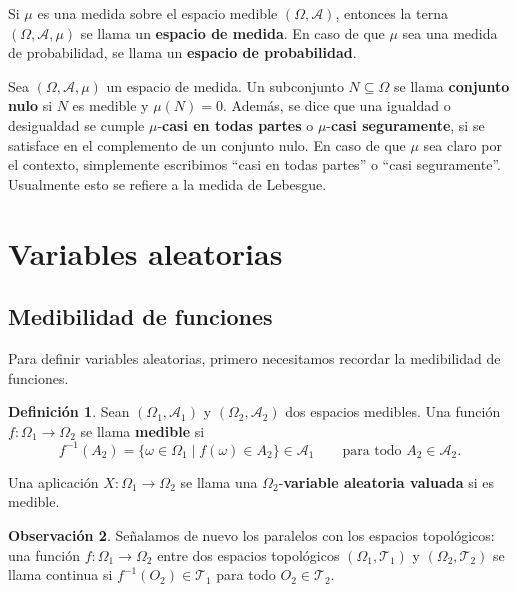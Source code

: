 \documentclass[11pt]{report}
\newenvironment{tcolorbox}[1][]{\par\medskip\noindent\ignorespaces}{\par\medskip}
\theoremstyle{definition}
\newtheorem{definicion}{Definición}[section]
\newtheorem{observacion}[definicion]{Observación}
\theoremstyle{plain}
\numberwithin{equation}{section}
\begin{document}
Si \(\mu\) es una medida sobre el espacio medible \((\Omega,\mathcal{A})\), entonces la terna \((\Omega,\mathcal{A},\mu)\) se llama un \textbf{espacio de medida}. En caso de que \(\mu\) sea una medida de probabilidad, se llama un \textbf{espacio de probabilidad}.

Sea \((\Omega,\mathcal{A},\mu)\) un espacio de medida. Un subconjunto \(N\subseteq \Omega\) se llama \textbf{conjunto nulo} si \(N\) es medible y \(\mu(N)=0\). Además, se dice que una igualdad o desigualdad se cumple \(\mu\)-\textbf{casi en todas partes} o \(\mu\)-\textbf{casi seguramente}, si se satisface en el complemento de un conjunto nulo. En caso de que \(\mu\) sea claro por el contexto, simplemente escribimos ``casi en todas partes'' o ``casi seguramente''. Usualmente esto se refiere a la medida de Lebesgue.

\section{Variables aleatorias}

\subsection{Medibilidad de funciones}

Para definir variables aleatorias, primero necesitamos recordar la medibilidad de funciones.

\begin{tcolorbox}[colback=blue!8, colframe=blue!8, boxrule=0pt]
\begin{definicion}
Sean \((\Omega_1,\mathcal{A}_1)\) y \((\Omega_2,\mathcal{A}_2)\) dos espacios medibles. Una función \(f:\Omega_1\to\Omega_2\) se llama \textbf{medible} si
\begin{equation*}
    f^{-1}(A_2)=\{\omega\in\Omega_1\mid f(\omega)\in A_2\}\in\mathcal{A}_1
    \qquad
    \text{para todo } A_2\in\mathcal{A}_2.
\end{equation*}

Una aplicación \(X:\Omega_1\to\Omega_2\) se llama una \(\Omega_2\)-\textbf{variable aleatoria valuada} si es medible.
\end{definicion}
\end{tcolorbox}

\begin{observacion}
Señalamos de nuevo los paralelos con los espacios topológicos: una función \(f:\Omega_1\to\Omega_2\) entre dos espacios topológicos \((\Omega_1,\mathcal{T}_1)\) y \((\Omega_2,\mathcal{T}_2)\) se llama continua si \(f^{-1}(O_2)\in\mathcal{T}_1\) para todo \(O_2\in\mathcal{T}_2\).
\end{observacion}
\end{document}
